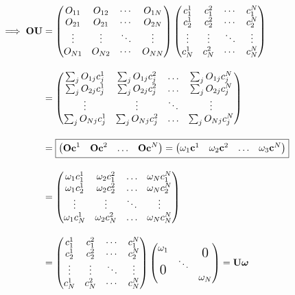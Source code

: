 \documentclass[12pt]{article}
\begin{document}
\[
\begin{split}
   \implies \mathbf{OU} & = \begin{pmatrix}
O_{11} & O_{12} & \cdots & O_{1N} \\
O_{21} & O_{21} & \cdots & O_{2N} \\
\vdots & \vdots & \ddots & \vdots \\
O_{N1} & O_{N2} & \cdots & O_{NN}
\end{pmatrix} \begin{pmatrix}
c_1^1 & c_1^2 & \cdots & c_1^N \\
c_2^1 & c_2^2 & \cdots & c_2^N \\
\vdots & \vdots & \ddots & \vdots \\
c_N^1 & c_N^2 & \cdots & c_N^N
\end{pmatrix} \\[1em]
& = \begin{pmatrix}
    \sum_{j} O_{1j} c_{j}^1 & \sum_{j} O_{1j} c_{j}^2 & \ldots & \sum_{j} O_{1j} c_{j}^N \\
    \sum_{j} O_{2j} c_{j}^1 & \sum_{j} O_{2j} c_{j}^2 & \ldots & \sum_{j} O_{2j} c_{j}^N \\
    \vdots & \vdots & \ddots & \vdots \\
    \sum_{j} O_{Nj} c_{j}^1 & \sum_{j} O_{Nj} c_{j}^2 & \ldots & \sum_{j} O_{Nj} c_{j}^N \\
\end{pmatrix} \\[1em]
& = \boxed{ \begin{pmatrix}
    \mathbf{Oc}^1 & \mathbf{Oc}^2 & \ldots & \mathbf{Oc}^N
\end{pmatrix} = \begin{pmatrix}
    \omega_1\mathbf{c}^1 & \omega_2\mathbf{c}^2 & \ldots & \omega_3\mathbf{c}^N
\end{pmatrix} }\\[1em]
& = \begin{pmatrix}
    \omega_1 c_{1}^1 & \omega_2 c_{1}^2 & \ldots & \omega_N c_{1}^N \\
    \omega_1 c_{2}^1 & \omega_2 c_{2}^2 & \ldots & \omega_N c_{2}^N \\
    \vdots & \vdots & \ddots & \vdots \\
    \omega_1 c_{N}^1 &\omega_2 c_{N}^2 & \ldots & \omega_N c_{N}^N \\
\end{pmatrix} \\[1em]
& =  \begin{pmatrix}
c_1^1 & c_1^2 & \cdots & c_1^N \\
c_2^1 & c_2^2 & \cdots & c_2^N \\
\vdots & \vdots & \ddots & \vdots \\
c_N^1 & c_N^2 & \cdots & c_N^N
\end{pmatrix} \begin{pmatrix}
\omega_1 & & \smash{\raisebox{-1.5ex}{\text{\Large 0}}} \\
 & \ddots & \\
\smash{\raisebox{1.5ex}{\text{\Large 0}}} & & \omega_N
\end{pmatrix} = \mathbf{U}\boldsymbol{\omega}
\end{split}
\]
\end{document}
